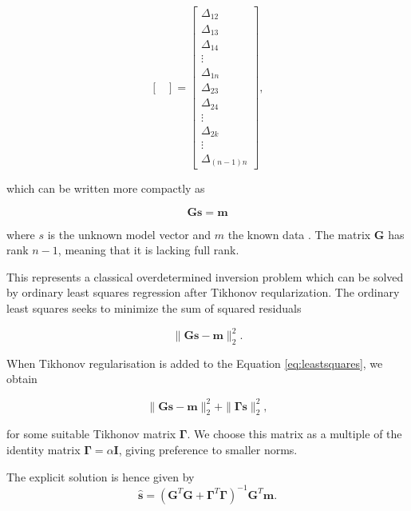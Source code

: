 \documentclass[12pt, sumlimits, intlimits]{article}
\begin{document}
\begin{equation*}
\begin{bmatrix}
\end{bmatrix}
= 
\begin{bmatrix}
\Delta_{12} \\ \Delta_{13} \\ \Delta_{14} \\ \vdots \\ \Delta_{1n} \\ \Delta_{23} \\ \Delta_{24} \\ \vdots \\ \Delta_{2k} \\ \vdots \\ \Delta_{(n-1)n}
\end{bmatrix} , 
\end{equation*}

which can be written more compactly as

\begin{equation}\label{eq:Gs=m}
\mathbf{Gs} = \mathbf{m}
\end{equation}

where $s$ is the unknown model vector and $m$ the known data \cite{sens2008}. The matrix $\mathbf{G}$ has rank $n-1$, meaning that it is lacking full rank. 

This represents a classical overdetermined inversion problem which can be solved by ordinary least squares regression after Tikhonov reqularization. The ordinary least squares seeks to minimize the sum of squared residuals

\begin{equation}
\| \mathbf{Gs}-\mathbf{m} \|_2^2.
\label{eq:leastsquares}
\end{equation}

When Tikhonov regularisation is added to the Equation \ref{eq:leastsquares}, we obtain

\begin{equation}
\| \mathbf{Gs}-\mathbf{m} \|_2^2 + \| \bm{\Gamma}\mathbf{s} \|_2^2,
\label{eq:tikhonov}
\end{equation}

for some suitable Tikhonov matrix $\bm{\Gamma}$. We choose this matrix as a multiple of the identity matrix $\bm{\Gamma} = \alpha\mathbf{I}$, giving preference to smaller norms. 

The explicit solution is hence given by 
\begin{equation}
\hat{\mathbf{s}} = (\mathbf{G}^T\mathbf{G} + \bm{\Gamma}^T\bm{\Gamma})^{-1}\mathbf{G}^T\mathbf{m}.  
\end{equation}
\end{document}
